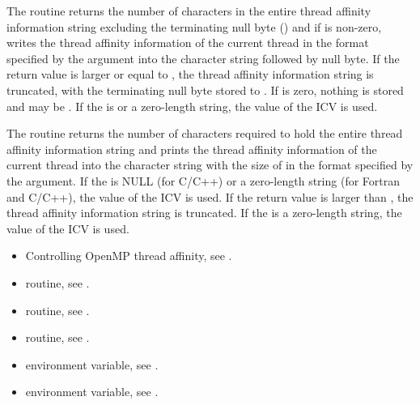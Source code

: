 \effect
\begin{ccppspecific}
The  routine returns the number of characters
in the entire thread affinity information string excluding the terminating
null byte () and if  is non-zero, writes the thread
affinity information of the current thread  in the format specified by the  argument
into the character string  followed by null byte.  If the return value is larger
or equal to , the thread affinity information string is truncated, with the terminating
null byte stored to {}.  If  is
zero, nothing is stored and  may be .
If the  is  or a zero-length string, the value of the
 ICV is used.
\end{ccppspecific}

\begin{fortranspecific}
The  routine returns the number of characters
required to hold the entire thread affinity information string
and prints the thread affinity information of the current thread
into the character string  with the size of
{} in the format specified by the  argument.
If the  is NULL (for C/C++)
or a zero-length string (for Fortran and C/C++), the value of the  ICV is used.
If the return value is larger than {}, the thread affinity
information string is truncated.
If the  is a zero-length string, the value of the  ICV is used.
\end{fortranspecific}

\crossreferences
\begin{itemize}
\item Controlling OpenMP thread affinity, see
.
\item {} routine, see .
\item {} routine, see .
\item {} routine, see .
\item {} environment variable, see
.
\item {} environment variable, see
.
\end{itemize}


